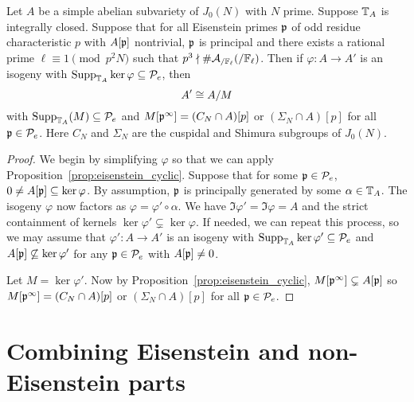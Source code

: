 \documentclass[thesis.tex]{subfiles}
\begin{document}
\begin{corollary}
    \label{cor:eisenstein}
    Let $A$ be a simple abelian subvariety of $J_0(N)$ with $N$ prime. Suppose
    $\mathbb{T}_A$ is integrally closed. Suppose that for all Eisenstein primes $\mathfrak{p}$
    of odd residue characteristic $p$ with $A[\mathfrak{p}]$ nontrivial, $\mathfrak{p}$ is
    principal and there exists a rational prime $\ell\equiv 1\pmod{p^2N}$ such
    that $p^3\nmid \#\mathcal{A}_{/\mathbb{F}_\ell}(/\mathbb{F}_\ell)$. Then if $\varphi:A\to
    A'$ is an isogeny with $\operatorname{Supp}_{\mathbb{T}_A} \ker\varphi\subseteq \mathcal{P}_e$, then
    \[
        A'\cong A/M
    \]
    with $\operatorname{Supp}_{\mathbb{T}_A}(M)\subseteq \mathcal{P}_e$ and $M[\mathfrak{p}^\infty]=(C_N\cap A)[p]$ or
    $(\Sigma_N\cap A)[p]$ for all $\mathfrak{p}\in \mathcal{P}_e$. Here $C_N$ and $\Sigma_N$ are
    the cuspidal and Shimura subgroups of $J_0(N)$.
\end{corollary}
\begin{proof}
    We begin by simplifying $\varphi$ so that we can apply
    Proposition~\ref{prop:eisenstein_cyclic}. Suppose that for some $\mathfrak{p}\in
    \mathcal{P}_e$, $0\neq A[\mathfrak{p}]\subseteq \ker\varphi$. By assumption, $\mathfrak{p}$ is
    principally generated by some $\alpha\in \mathbb{T}_A$. The isogeny $\varphi$ now
    factors as $\varphi=\varphi'\circ \alpha$. We have
    $\Im\varphi'=\Im\varphi=A$ and the strict containment of kernels
    $\ker\varphi'\subsetneq \ker\varphi$. If needed, we can repeat this
    process, so we may assume that $\varphi':A\to A'$ is an isogeny with
    $\operatorname{Supp}_{\mathbb{T}_A}\ker\varphi'\subseteq \mathcal{P}_e$ and $A[\mathfrak{p}]\not\subseteq
    \ker\varphi'$ for any $\mathfrak{p}\in \mathcal{P}_e$ with $A[\mathfrak{p}]\neq 0$.

    Let $M=\ker\varphi'$. Now by Proposition~\ref{prop:eisenstein_cyclic},
    $M[\mathfrak{p}^\infty]\subsetneq A[\mathfrak{p}]$ so $M[\mathfrak{p}^\infty]=(C_N\cap A)[p]$ or
    $(\Sigma_N\cap A)[p]$ for all $\mathfrak{p}\in \mathcal{P}_e$.
\end{proof}


\section{Combining Eisenstein and non-Eisenstein parts}%
\label{sec:combining_eisenstein_and_non_eisenstein_parts}
\end{document}

